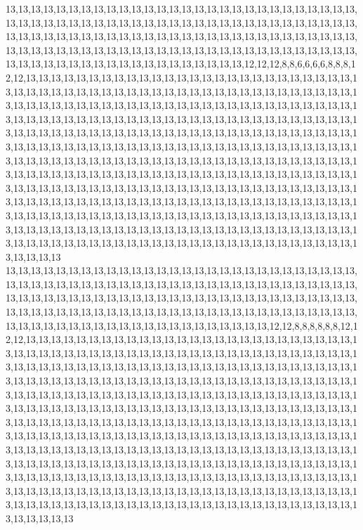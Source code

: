 13,13,13,13,13,13,13,13,13,13,13,13,13,13,13,13,13,13,13,13,13,13,13,13,13,13,13,13,13,13,13,13,13,13,13,13,13,13,13,13,13,13,13,13,13,13,13,13,13,13,13,13,13,13,13,13,13,13,13,13,13,13,13,13,13,13,13,13,13,13,13,13,13,13,13,13,13,13,13,13,13,13,13,13,13,13,13,13,13,13,13,13,13,13,13,13,13,13,13,13,13,13,13,13,13,13,13,13,13,13,13,13,13,13,13,13,13,13,13,13,13,13,13,13,13,13,13,13,13,13,13,12,12,12,8,8,6,6,6,6,8,8,8,12,12,13,13,13,13,13,13,13,13,13,13,13,13,13,13,13,13,13,13,13,13,13,13,13,13,13,13,13,13,13,13,13,13,13,13,13,13,13,13,13,13,13,13,13,13,13,13,13,13,13,13,13,13,13,13,13,13,13,13,13,13,13,13,13,13,13,13,13,13,13,13,13,13,13,13,13,13,13,13,13,13,13,13,13,13,13,13,13,13,13,13,13,13,13,13,13,13,13,13,13,13,13,13,13,13,13,13,13,13,13,13,13,13,13,13,13,13,13,13,13,13,13,13,13,13,13,13,13,13,13,13,13,13,13,13,13,13,13,13,13,13,13,13,13,13,13,13,13,13,13,13,13,13,13,13,13,13,13,13,13,13,13,13,13,13,13,13,13,13,13,13,13,13,13,13,13,13,13,13,13,13,13,13,13,13,13,13,13,13,13,13,13,13,13,13,13,13,13,13,13,13,13,13,13,13,13,13,13,13,13,13,13,13,13,13,13,13,13,13,13,13,13,13,13,13,13,13,13,13,13,13,13,13,13,13,13,13,13,13,13,13,13,13,13,13,13,13,13,13,13,13,13,13,13,13,13,13,13,13,13,13,13,13,13,13,13,13,13,13,13,13,13,13,13,13,13,13,13,13,13,13,13,13,13,13,13,13,13,13,13,13,13,13,13,13,13,13,13,13,13,13,13,13,13,13,13,13,13,13,13,13,13,13,13,13,13,13,13,13,13,13,13,13,13,13,13,13,13,13,13,13,13,13,13,13,13,13,13,13,13,13,13,13,13,13,13,13,13,13,13,13,13,13,13,13,13,13,13,13,13,13,13,13,13,13,13,13,13
13,13,13,13,13,13,13,13,13,13,13,13,13,13,13,13,13,13,13,13,13,13,13,13,13,13,13,13,13,13,13,13,13,13,13,13,13,13,13,13,13,13,13,13,13,13,13,13,13,13,13,13,13,13,13,13,13,13,13,13,13,13,13,13,13,13,13,13,13,13,13,13,13,13,13,13,13,13,13,13,13,13,13,13,13,13,13,13,13,13,13,13,13,13,13,13,13,13,13,13,13,13,13,13,13,13,13,13,13,13,13,13,13,13,13,13,13,13,13,13,13,13,13,13,13,13,13,13,13,13,13,13,13,12,12,8,8,8,8,8,8,12,12,12,13,13,13,13,13,13,13,13,13,13,13,13,13,13,13,13,13,13,13,13,13,13,13,13,13,13,13,13,13,13,13,13,13,13,13,13,13,13,13,13,13,13,13,13,13,13,13,13,13,13,13,13,13,13,13,13,13,13,13,13,13,13,13,13,13,13,13,13,13,13,13,13,13,13,13,13,13,13,13,13,13,13,13,13,13,13,13,13,13,13,13,13,13,13,13,13,13,13,13,13,13,13,13,13,13,13,13,13,13,13,13,13,13,13,13,13,13,13,13,13,13,13,13,13,13,13,13,13,13,13,13,13,13,13,13,13,13,13,13,13,13,13,13,13,13,13,13,13,13,13,13,13,13,13,13,13,13,13,13,13,13,13,13,13,13,13,13,13,13,13,13,13,13,13,13,13,13,13,13,13,13,13,13,13,13,13,13,13,13,13,13,13,13,13,13,13,13,13,13,13,13,13,13,13,13,13,13,13,13,13,13,13,13,13,13,13,13,13,13,13,13,13,13,13,13,13,13,13,13,13,13,13,13,13,13,13,13,13,13,13,13,13,13,13,13,13,13,13,13,13,13,13,13,13,13,13,13,13,13,13,13,13,13,13,13,13,13,13,13,13,13,13,13,13,13,13,13,13,13,13,13,13,13,13,13,13,13,13,13,13,13,13,13,13,13,13,13,13,13,13,13,13,13,13,13,13,13,13,13,13,13,13,13,13,13,13,13,13,13,13,13,13,13,13,13,13,13,13,13,13,13,13,13,13,13,13,13,13,13,13,13,13,13,13,13,13,13,13,13,13,13,13,13,13,13,13,13,13,13,13,13,13,13,13,13,13,13,13

